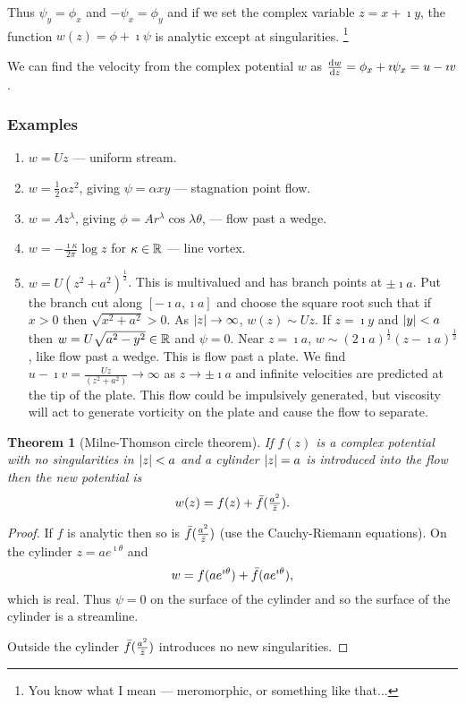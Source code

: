 \documentclass{notes}
\theoremstyle{plain}
\newtheorem*{theorem}{Theorem}
\begin{document}
Thus $\psi_y = \phi_x$ and $-\psi_x = \phi_y$ and if we set the
complex variable $z = x + \imath y$, the function $w(z) = \phi + \imath \psi$
is analytic except at singularities.%
\footnote{You know what I mean --- meromorphic, or something like that...}

We can find the velocity from the complex potential $w$ as
$\frac{\mathrm{d} w}{\mathrm{d} z} = \phi_x + \imath \psi_x = u - \imath v$.

\subsubsection*{Examples}

\begin{enumerate}
\item $w = U z$ --- uniform stream.
\item $w = \tfrac{1}{2} \alpha z^2$, giving $\psi = \alpha x y$ ---
stagnation point flow.
\item $w = A z^\lambda$, giving $\phi = A r^\lambda \cos \lambda \theta$,
--- flow past a wedge.
\item $w = - \frac{\imath \kappa}{2 \pi} \log z$ for $\kappa \in \mathbb{R}$ ---
line vortex.
\item $w = U \left(z^2 + a^2\right)^{\frac{1}{2}}$.  This is multivalued
and has branch points at $\pm \imath a$. Put the branch cut along
$[-\imath a, \imath a]$ and choose the square root such that if
$x > 0$ then $\sqrt{x^2 + a^2} > 0$.  As $\left|z\right| \to \infty$,
$w(z) \sim U z$.  If $z = \imath y$ and $\left|y\right| < a$ then
$w = U \sqrt{a^2 - y^2} \in \mathbb{R}$ and $\psi = 0$.  Near $z = \imath a$,
$w \sim \left(2 \imath a \right)^{\frac{1}{2}} \left( z - \imath a
\right)^{\frac{1}{2}}$, like flow past a wedge.  This is flow past a plate.
We find $u - \imath v = \frac{U z}{\left( z^2 + a^2 \right)} \to \infty$
as $z \to \pm \imath a$ and infinite velocities are predicted at the tip
of the plate.  This flow could be impulsively generated, but viscosity will
act to generate vorticity on the plate and cause the flow to separate.
\end{enumerate}

\begin{theorem}[Milne-Thomson circle theorem]
If $f(z)$ is a complex potential with no singularities in
$\left|z\right| < a$ and a cylinder $\left|z\right| = a$ is introduced into the
flow then the new potential is
\[
w(z) = f(z) + \Bar{f}(\tfrac{a^2}{\Bar{z}}).
\]
\end{theorem}

\begin{proof}
If $f$ is analytic then so is $\Bar{f}(\tfrac{a^2}{\Bar{z}})$ (use
the Cauchy-Riemann equations).  On the cylinder $z = a e^{\imath \theta}$
and
\[
w = f(a e^{\imath \theta}) + \Bar{f}(a e^{\imath \theta}),
\]
which is real.  Thus $\psi = 0$ on the surface of the cylinder and so
the surface of the cylinder is a streamline.

Outside the cylinder $\Bar{f}(\tfrac{a^2}{\Bar{z}})$ introduces no
new singularities.
\end{proof}
\end{document}
